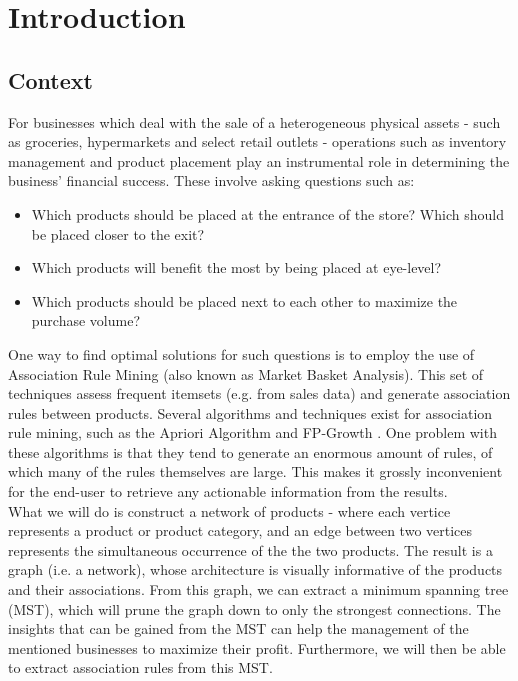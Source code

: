 \documentclass[a4paper,11pt]{article}
\begin{document}
\newpage
\tableofcontents

\newpage
\section{Introduction}
\subsection{Context}
For businesses which deal with the sale of a heterogeneous physical assets - such as groceries, hypermarkets and select retail outlets - operations such as inventory management and product placement play an instrumental role in determining the business' financial success. These involve asking questions such as:
\begin{itemize}
\item Which products should be placed at the entrance of the store? Which should be placed closer to the exit?
\item Which products will benefit the most by being placed at eye-level?
\item Which products should be placed next to each other to maximize the purchase volume?
\end{itemize}
One way to find optimal solutions for such questions is to employ the use of Association Rule Mining (also known as Market Basket Analysis). This set of techniques assess frequent itemsets (e.g. from sales data) and generate association rules between products. Several algorithms and techniques exist for association rule mining, such as the Apriori Algorithm and FP-Growth \cite{fp_growth}. One problem with these algorithms is that they tend to generate an enormous amount of rules, of which many of the rules themselves are large. This makes it grossly inconvenient for the end-user to retrieve any actionable information from the results.\\
What we will do is construct a network of products - where each vertice represents a product or product category, and an edge between two vertices represents the simultaneous occurrence of the the two products. The result is a graph (i.e. a network), whose architecture is visually informative of the products and their associations.  From this graph, we can extract a minimum spanning tree (MST), which will prune the graph down to only the strongest connections. The insights that can be gained from the MST can help the management of the mentioned businesses to maximize their profit.  Furthermore, we will then be able to extract association rules from this MST.
\end{document}
